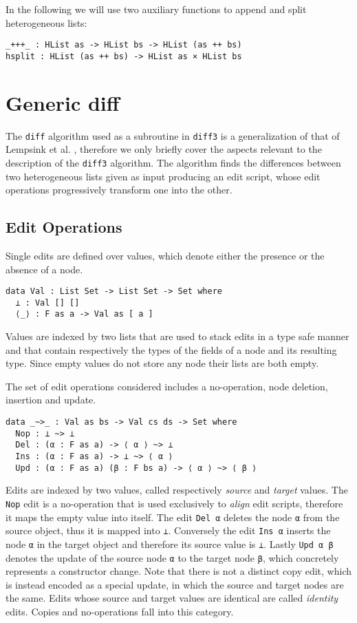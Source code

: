 \documentclass[preprint]{sigplanconf}
\begin{document}
	In the following we will use two auxiliary functions to append and split 
	heterogeneous lists:
\begin{verbatim}
_+++_ : HList as -> HList bs -> HList (as ++ bs)
hsplit : HList (as ++ bs) -> HList as × HList bs
\end{verbatim}
	
\section{Generic diff}
	The \texttt{diff} algorithm used as a subroutine in \texttt{diff3} is a
	generalization of that of Lempsink et al. \cite{Lemp09}, therefore
	we only briefly cover the aspects relevant to the description of
	the \texttt{diff3} algorithm.
	The algorithm finds the differences between two heterogeneous lists given 
	as input producing an edit script, whose edit operations progressively 
	transform one into the other.

	\subsection{Edit Operations}
	Single edits are defined over values, which denote either the presence or 
	the absence of a node.
\begin{verbatim}
data Val : List Set -> List Set -> Set where
  ⊥ : Val [] []
  ⟨_⟩ : F as a -> Val as [ a ] 
\end{verbatim}
	Values are indexed by two lists that are used to stack edits in a type 
	safe manner and	that contain respectively the types of the fields of a node 
	and its resulting type.
	Since empty values do not store any node their lists are both empty.

	The set of edit operations considered includes a no-operation, node 
	deletion, insertion and update.
\begin{verbatim}
data _~>_ : Val as bs -> Val cs ds -> Set where
  Nop : ⊥ ~> ⊥
  Del : (α : F as a) -> ⟨ α ⟩ ~> ⊥
  Ins : (α : F as a) -> ⊥ ~> ⟨ α ⟩
  Upd : (α : F as a) (β : F bs a) -> ⟨ α ⟩ ~> ⟨ β ⟩
\end{verbatim}
	Edits are indexed by two values, called respectively 
	\emph{source} and \emph{target} values. The \texttt{Nop} edit is 
	a no-operation that is used exclusively to \emph{align} edit scripts,
	therefore it maps the empty value into itself.
	The edit \texttt{Del α} deletes the node \texttt{α} from the source object, 
	thus it is mapped into \texttt{⊥}. Conversely the edit \texttt{Ins α} 
	inserts the node \texttt{α} in the target object and therefore its source value 
	is 	\texttt{⊥}.
	Lastly \texttt{Upd α β} denotes the update of the source node \texttt{α}
	to the target node \texttt{β}, which concretely represents a 
	constructor change. 
	Note that there is not a distinct copy edit, which is instead encoded as a 
	special	update, in which the source and target nodes are the same.
	Edits whose source and target values are identical are 
	called \emph{identity} edits. Copies and no-operations fall into this
	category.
	
\end{document}
